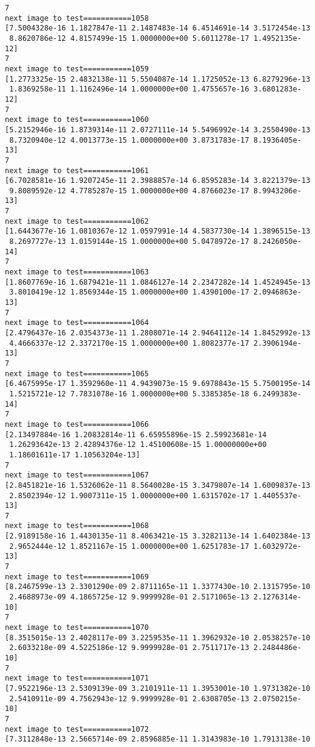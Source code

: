 \documentclass[11pt]{article}
\begin{document}
\begin{Verbatim}[commandchars=\\\{\}]
7
next image to test===========1058
[7.5004328e-16 1.1827847e-11 2.1487483e-14 6.4514691e-14 3.5172454e-13
 8.8620786e-12 4.8157499e-15 1.0000000e+00 5.6011278e-17 1.4952135e-12]
7
next image to test===========1059
[1.2773325e-15 2.4832138e-11 5.5504087e-14 1.1725052e-13 6.8279296e-13
 1.8369258e-11 1.1162496e-14 1.0000000e+00 1.4755657e-16 3.6801283e-12]
7
next image to test===========1060
[5.2152946e-16 1.8739314e-11 2.0727111e-14 5.5496992e-14 3.2550490e-13
 8.7320940e-12 4.0013773e-15 1.0000000e+00 3.8731783e-17 8.1936405e-13]
7
next image to test===========1061
[6.7028581e-16 1.9207245e-11 2.3988857e-14 6.8595283e-14 3.8221379e-13
 9.8089592e-12 4.7785287e-15 1.0000000e+00 4.8766023e-17 8.9943206e-13]
7
next image to test===========1062
[1.6443677e-16 1.0810367e-12 1.0597991e-14 4.5837730e-14 1.3896515e-13
 8.2697727e-13 1.0159144e-15 1.0000000e+00 5.0478972e-17 8.2426050e-14]
7
next image to test===========1063
[1.8607769e-16 1.6879421e-11 1.0846127e-14 2.2347282e-14 1.4524945e-13
 3.8010419e-12 1.8569344e-15 1.0000000e+00 1.4390100e-17 2.0946863e-13]
7
next image to test===========1064
[2.4796437e-16 2.0354373e-11 1.2808071e-14 2.9464112e-14 1.8452992e-13
 4.4666337e-12 2.3372170e-15 1.0000000e+00 1.8082377e-17 2.3906194e-13]
7
next image to test===========1065
[6.4675995e-17 1.3592960e-11 4.9439073e-15 9.6978843e-15 5.7500195e-14
 1.5215721e-12 7.7831078e-16 1.0000000e+00 5.3385385e-18 6.2499383e-14]
7
next image to test===========1066
[2.13497884e-16 1.20832814e-11 6.65955896e-15 2.59923681e-14
 1.26293642e-13 2.42894376e-12 1.45100608e-15 1.00000000e+00
 1.18601611e-17 1.10563204e-13]
7
next image to test===========1067
[2.8451821e-16 1.5326062e-11 8.5640028e-15 3.3479807e-14 1.6009837e-13
 2.8502394e-12 1.9007311e-15 1.0000000e+00 1.6315702e-17 1.4405537e-13]
7
next image to test===========1068
[2.9189158e-16 1.4430135e-11 8.4063421e-15 3.3282113e-14 1.6402384e-13
 2.9652444e-12 1.8521167e-15 1.0000000e+00 1.6251783e-17 1.6032972e-13]
7
next image to test===========1069
[8.2467599e-13 2.3301290e-09 2.8711165e-11 1.3377430e-10 2.1315795e-10
 2.4688973e-09 4.1865725e-12 9.9999928e-01 2.5171065e-13 2.1276314e-10]
7
next image to test===========1070
[8.3515015e-13 2.4028117e-09 3.2259535e-11 1.3962932e-10 2.0538257e-10
 2.6033218e-09 4.5225186e-12 9.9999928e-01 2.7511717e-13 2.2484486e-10]
7
next image to test===========1071
[7.9522196e-13 2.5309139e-09 3.2101911e-11 1.3953001e-10 1.9731382e-10
 2.5410911e-09 4.7562943e-12 9.9999928e-01 2.6308705e-13 2.0750215e-10]
7
next image to test===========1072
[7.3112848e-13 2.5665714e-09 2.8596885e-11 1.3143983e-10 1.7913138e-10

\end{Verbatim}
\end{document}
